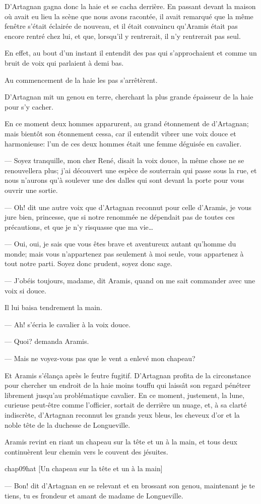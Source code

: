 D'Artagnan gagna donc la haie et se cacha derrière. En passant devant la maison où avait eu lieu la scène que nous avons racontée, il avait remarqué que la même fenêtre s'était éclairée de nouveau, et il était convaincu qu'Aramis était pas encore rentré chez lui, et que, lorsqu'il y rentrerait, il n'y rentrerait pas seul.

En effet, au bout d'un instant il entendit des pas qui s'approchaient et comme un bruit de voix qui parlaient à demi bas.

Au commencement de la haie les pas s'arrêtèrent.

D'Artagnan mit un genou en terre, cherchant la plus grande épaisseur de la haie pour s'y cacher.

En ce moment deux hommes apparurent, au grand étonnement de d'Artagnan; mais bientôt son étonnement cessa, car il entendit vibrer une voix douce et harmonieuse: l'un de ces deux hommes était une femme déguisée en cavalier.

— Soyez tranquille, mon cher René, disait la voix douce, la même chose ne se renouvellera plus; j'ai découvert une espèce de souterrain qui passe sous la rue, et nous n'aurons qu'à soulever une des dalles qui sont devant la porte pour vous ouvrir une sortie.

— Oh! dit une autre voix que d'Artagnan reconnut pour celle d'Aramis, je vous jure bien, princesse, que si notre renommée ne dépendait pas de toutes ces précautions, et que je n'y risquasse que ma vie\dots

— Oui, oui, je sais que vous êtes brave et aventureux autant qu'homme du monde; mais vous n'appartenez pas seulement à moi seule, vous appartenez à tout notre parti. Soyez donc prudent, soyez donc sage.

— J'obéis toujours, madame, dit Aramis, quand on me sait commander avec une voix si douce.

Il lui baisa tendrement la main.

— Ah! s'écria le cavalier à la voix douce.

— Quoi? demanda Aramis.

— Mais ne voyez-vous pas que le vent a enlevé mon chapeau?

Et Aramis s'élança après le feutre fugitif. D'Artagnan profita de la circonstance pour chercher un endroit de la haie moins touffu qui laissât son regard pénétrer librement jusqu'au problématique cavalier. En ce moment, justement, la lune, curieuse peut-être comme l'officier, sortait de derrière un nuage, et, à sa clarté indiscrète, d'Artagnan reconnut les grands yeux bleus, les cheveux d'or et la noble tête de la duchesse de Longueville.

Aramis revint en riant un chapeau sur la tête et un à la main, et tous deux continuèrent leur chemin vers le couvent des jésuites.

\begin{bwbigpic}
	[\basicscale] 
	{chap09hat}
	[Un chapeau sur la tête et un à la main]
\end{bwbigpic}


— Bon! dit d'Artagnan en se relevant et en brossant son genou, maintenant je te tiens, tu es frondeur et amant de madame de Longueville.